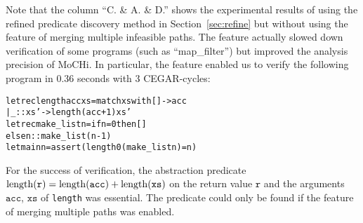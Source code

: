 Note that the column ``C. \& A. \& D.'' shows the experimental results 
of using the refined predicate discovery method in 
Section~\ref{sec:refine} but without using the feature of merging 
multiple infeasible paths.  The feature actually slowed down 
verification of some programs (such as ``map\_filter'') but improved the 
analysis precision of MoCHi.  In particular, the feature enabled us to 
verify the following program in 0.36 seconds with 3 CEGAR-cycles:
\begin{alltt}
let rec length acc xs = match xs with [] -> acc
                      | _::xs' -> length (acc+1) xs'
let rec make_list n = if n = 0 then []
                      else n :: make_list (n-1)
let main n = assert (length 0 (make_list n) = n)
\end{alltt}
For the success of verification, the abstraction predicate 
$\mathrm{length}(\mathtt{r}) = \mathrm{length}(\mathtt{acc}) + \mathrm{length}(\mathtt{xs})$ on 
the return value $\mathtt{r}$ and the arguments $\mathtt{acc}$, 
$\mathtt{xs}$ of \texttt{length} was essential.  The predicate could 
only be found if the feature of merging multiple paths was enabled.

